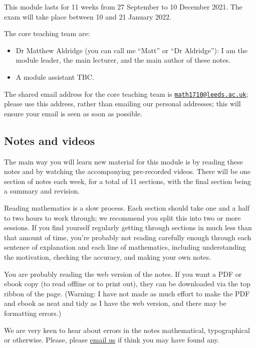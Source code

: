 \documentclass[
  a4paper,
]{book}
\providecommand{\tightlist}{%
  \setlength{\itemsep}{0pt}\setlength{\parskip}{0pt}}
\theoremstyle{definition}
\theoremstyle{definition}
\theoremstyle{definition}
\theoremstyle{definition}
\theoremstyle{remark}
\begin{document}
This module lasts for 11 weeks from 27 September to 10 December 2021. The exam will take place between 10 and 21 January 2022.

The core teaching team are:

\begin{itemize}
\tightlist
\item
  Dr Matthew Aldridge (you can call me ``Matt'' or ``Dr Aldridge''): I am the module leader, the main lecturer, and the main author of these notes.
\item
  A module assistant TBC.
\end{itemize}

The shared email address for the core teaching team is \href{mailto:math1710@leeds.ac.uk}{\nolinkurl{math1710@leeds.ac.uk}}; please use this address, rather than emailing our personal addresses; this will ensure your email is seen as soon as possible.

\hypertarget{notes}{%
\subsection*{Notes and videos}\label{notes}}

The main way you will learn new material for this module is by reading these notes and by watching the accompanying pre-recorded videos. There will be one section of notes each week, for a total of 11 sections, with the final section being a summary and revision.

Reading mathematics is a slow process. Each section should take one and a half to two hours to work through; we recommend you split this into two or more sessions. If you find yourself regularly getting through sections in much less than that amount of time, you're probably not reading carefully enough through each sentence of explanation and each line of mathematics, including understanding the motivation, checking the accuracy, and making your own notes.

You are probably reading the web version of the notes. If you want a PDF or ebook copy (to read offline or to print out), they can be downloaded via the top ribbon of the page. (Warning: I have not made as much effort to make the PDF and ebook as neat and tidy as I have the web version, and there may be formatting errors.)

We are very keen to hear about errors in the notes mathematical, typographical or otherwise. Please, please \href{mailto:math1710@leeds.ac.uk}{email us} if think you may have found any.
\end{document}
